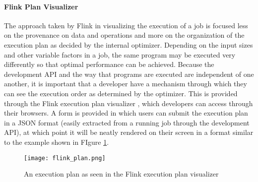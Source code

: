 \paragraph{Flink Plan Visualizer}
The approach taken by Flink in visualizing the execution of a job is focused less on the provenance on data and operations and more on the organization of the execution plan as decided by the internal optimizer. Depending on the input sizes and other variable factors in a job, the same program may be executed very differently so that optimal performance can be achieved. Because the development API and the way that programs are executed are independent of one another, it is important that a developer have a mechanism through which they can see the execution order as determined by the optimizer. This is provided through the Flink execution plan visualizer \citep{ApacheSoftwareFoundation2014}, which developers can access through their browsers. A form is provided in which users can submit the execution plan in a JSON format (easily extracted from a running job through the development API), at which point it will be neatly rendered on their screen in a format similar to the example shown in FIgure \ref{fig:flinkplan}.

\begin{figure}
	\centering
	\texttt{[image: flink\_plan.png]}
	\caption{An execution plan as seen in the Flink execution plan visualizer	\citep{ApacheSoftwareFoundation2014}}
	\label{fig:flinkplan}	
\end{figure}


